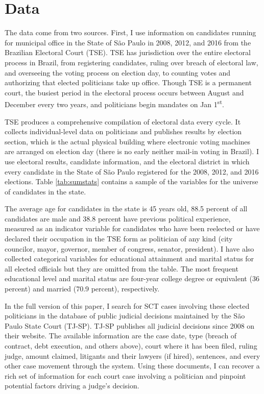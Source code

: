 \documentclass[11pt]{article}
\begin{document}
\section{Data} \label{sec:data_paper2}

The data come from two sources. First, I use information on candidates running for municipal office in the State of São Paulo in 2008, 2012, and 2016 from the Brazilian Electoral Court (TSE). TSE has jurisdiction over the entire electoral process in Brazil, from registering candidates, ruling over breach of electoral law, and overseeing the voting process on election day, to counting votes and authorizing that elected politicians take up office. Though TSE is a permanent court, the busiest period in the electoral process occurs between August and December every two years, and politicians begin mandates on Jan 1\textsuperscript{st}.

TSE produces a comprehensive compilation of electoral data every cycle. It collects individual-level data on politicians and publishes results by election section, which is the actual physical building where electronic voting machines are arranged on election day (there is no early neither mail-in voting in Brazil). I use electoral results, candidate information, and the electoral district in which every candidate in the State of São Paulo registered for the 2008, 2012, and 2016 elections. Table \ref{tab:sumstats} contains a sample of the variables for the universe of candidates in the state.



The average age for candidates in the state is 45 years old, 88.5 percent of all candidates are male and 38.8 percent have previous political experience, measured as an indicator variable for candidates who have been reelected or have declared their occupation in the TSE form as politician of any kind (city councilor, mayor, governor, member of congress, senator, president). I have also collected categorical variables for educational attainment and marital status for all elected officials but they are omitted from the table. The most frequent educational level and marital status are four-year college degree or equivalent (36 percent) and married (70.9 percent), respectively.

In the full version of this paper, I search for SCT cases involving these elected politicians in the database of public judicial decisions maintained by the São Paulo State Court (TJ-SP). TJ-SP publishes all judicial decisions since 2008 on their website. The available information are the case date, type (breach of contract, debt execution, and others above), court where it has been filed, ruling judge, amount claimed, litigants and their lawyers (if hired), sentences, and every other case movement through the system. Using these documents, I can recover a rich set of information for each court case involving a politician and pinpoint potential factors driving a judge's decision.
\end{document}
